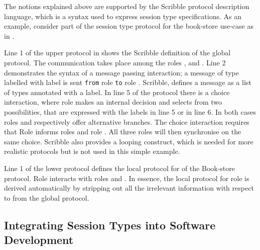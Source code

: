 \label{sec:scribble}
The notions explained above are supported by the
Scribble protocol description language,
which is a syntax used to express session type specifications.
As an example,
consider part of the session type protocol for the book-store
use-case as in .




Line 1 of the upper protocol in  shows the
Scribble definition of the global protocol.
The communication takes place
among the roles \BuyerOne, \BuyerTwo and \Seller. Line 2 demonstrates
the syntax of a message passing interaction; a message
of type  labelled with label  is sent \lstinline|from|
role \BuyerOne \lstinline|to| role \Seller. Scribble, defines a message 
as a list of types annotated with a label.
%
In line 5 of the protocol
there is a choice interaction,
where role \BuyerTwo makes an internal decision and selects
from two possibilities, that are
expressed with the labels  in line 5 or  in line 6.
In  both cases roles \BuyerOne and \Seller respectively offer
alternative branches. The choice interaction requires that
Role \BuyerTwo informs roles \BuyerOne and role \Seller. All
three roles will then synchronise on the same choice.
%
Scribble also provides a looping construct, which is needed for more realistic
protocols but is not used in this simple example.


Line 1 of the lower protocol defines the local protocol
for \BuyerOne of the Book-store protocol. Role \BuyerOne
interacts with roles \BuyerTwo and \Seller. In essence,
the local protocol for role \BuyerOne is derived automatically
by stripping out all the irrelevant information with respect
to \BuyerOne from the global protocol.



\subsection{Integrating Session Types into Software Development}%
\label{sec:sessions_integrate}

